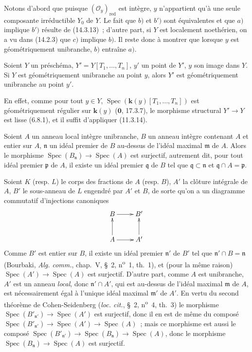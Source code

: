 Notons d'abord que puisque $(\mathcal O_y)_{\mathrm{red}}$ est intègre, $y$
n'appartient qu'à une seule composante irréductible $Y_0$ de $Y$. Le fait que $b)$
et $b')$ sont équivalentes et que $a)$ implique $b')$ résulte de (14.3.13)~;
d'autre part, si $Y$ est localement noethérien, on a vu dans (14.2.3) que $c)$
implique $b)$. Il reste donc à montrer que lorsque $y$ est géométriquement
unibranche, $b)$ entraîne $a)$.

\begin{lemma}[14.4.1.1]
\label{IV.14.4.1.1-fr}
Soient $Y$ un préschéma, $Y'=Y[T_1,\ldots,T_n]$, $y'$ un point de $Y'$, $y$ son
image dans $Y$. Si $Y$ est géométriquement unibranche au point $y$, alors $Y'$ est
géométriquement unibranche au point $y'$.
\end{lemma}

En effet, comme pour tout $y\in Y$,
$\operatorname{Spec}(\boldsymbol{k}(y)[T_1,\ldots,T_n])$ est géométriquement régulier sur $\boldsymbol{k}(y)$
($\mathbf{0}$, 17.3.7), le morphisme structural $Y'\to Y$ est lisse
(6.8.1), et il suffit d'appliquer (11.3.14).

\begin{lemma}[14.4.1.2]
\label{IV.14.4.1.2-fr}
Soient $A$ un anneau local intègre \textup{unibranche}, $B$ un anneau intègre contenant $A$
et entier sur $A$, $\mathfrak n$ un idéal premier de $B$ au-dessus de l'idéal
maximal $\mathfrak m$ de $A$. Alors le morphisme
$\operatorname{Spec}(B_{\mathfrak n})\to\operatorname{Spec}(A)$ est surjectif,
autrement dit, pour tout idéal premier $\mathfrak p$ de $A$, il existe un idéal
premier $\mathfrak q$ de $B$ tel que $\mathfrak q\subset\mathfrak n$ et
$\mathfrak q\cap A=\mathfrak p$.
\end{lemma}

Soient $K$ (resp. $L$) le corps des fractions de $A$ (resp. $B$), $A'$ la clôture
intégrale de $A$, $B'$ le sous-anneau de $L$ engendré par $A'$ et $B$, de sorte
qu'on a un diagramme commutatif d'injections canoniques
\[
  \xymatrix{
    B \ar[r] & B' \\
    A \ar[u] \ar[r] & A' \ar[u]
  }
\]
Comme $B'$ est entier sur $B$, il existe un idéal premier $\mathfrak n'$ de $B'$
tel que $\mathfrak n'\cap B=\mathfrak n$ (Bourbaki, \emph{Alg. comm.}, chap.~V,
\S~2, n\textsuperscript{o}~1, th.~1), et (pour la même raison)
$\operatorname{Spec}(A')\to\operatorname{Spec}(A)$ est surjectif. D'autre part,
comme $A$ est unibranche, $A'$ est un anneau \emph{local}, donc
$\mathfrak n'\cap A'$, qui est au-dessus de l'idéal maximal $\mathfrak m$ de $A$,
est nécessairement égal à l'unique idéal maximal $\mathfrak m'$ de $A'$. En vertu
du second théorème de Cohen-Seidenberg (\emph{loc. cit.}, \S~2,
n\textsuperscript{o}~4, th.~3) le morphisme
$\operatorname{Spec}(B'_{\mathfrak n'})\to\operatorname{Spec}(A')$ est surjectif,
donc il en est de même du composé
$\operatorname{Spec}(B'_{\mathfrak n'})\to\operatorname{Spec}(A')\to
\operatorname{Spec}(A)$~; mais ce morphisme est aussi le composé
$\operatorname{Spec}(B'_{\mathfrak n'})\to\operatorname{Spec}(B_{\mathfrak n})
\to\operatorname{Spec}(A)$, donc le morphisme
$\operatorname{Spec}(B_{\mathfrak n})\to\operatorname{Spec}(A)$ est surjectif.

